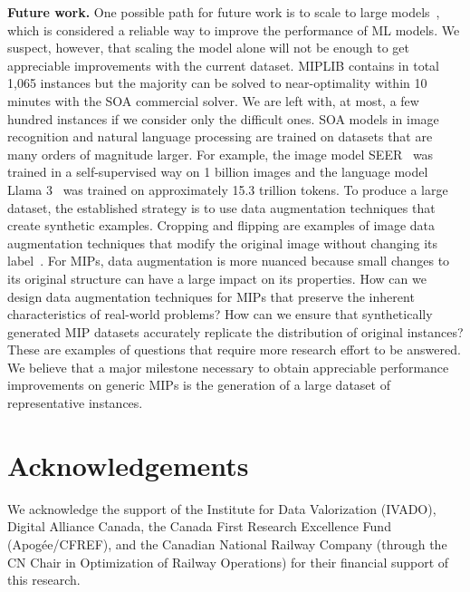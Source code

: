 \documentclass[3p, authoryear, times]{elsarticle}
\begin{document}
\textbf{Future work. } One possible path for future work is to scale to large models~\citep{kaplan_scaling_2020}, which is considered a reliable way to improve the performance of ML models. We suspect, however, that scaling the model alone will not be enough to get appreciable improvements with the current dataset.  MIPLIB contains in total 1,065 instances but the majority can be solved to near-optimality within 10 minutes with the SOA commercial solver. We are left with, at most, a few hundred instances if we consider only the difficult ones. SOA models in image recognition and natural language processing are trained on datasets that are many orders of magnitude larger. For example, the image model SEER~\citep{goyal_self-supervised_2021} was trained in a self-supervised way on 1 billion images and the language model Llama 3~\citep{dubey_llama_2024_fixed} was trained on approximately 15.3 trillion tokens. To produce a large dataset, the established strategy is to use data augmentation techniques that create synthetic examples. Cropping and flipping are examples of image data augmentation techniques that modify the original image without changing its label~\citep{shorten_survey_2019}. For MIPs, data augmentation is more nuanced because small changes to its original structure can have a large impact on its properties. How can we design data augmentation techniques for MIPs that preserve the inherent characteristics of real-world problems? How can we ensure that synthetically generated MIP datasets accurately replicate the distribution of original instances? These are examples of questions that require more research effort to be answered.  We believe that a major milestone necessary to obtain appreciable performance improvements on generic MIPs is the generation of a large dataset of representative instances. 






\section*{Acknowledgements} 

We acknowledge the support of the Institute for Data Valorization (IVADO), Digital Alliance Canada, the Canada First Research Excellence Fund (Apogée/CFREF), and the Canadian National Railway Company (through the CN Chair in Optimization of Railway Operations) for their financial support of this research. %


\newpage

\clearpage

\newpage

\newpage

\clearpage

\newpage




\end{document}
